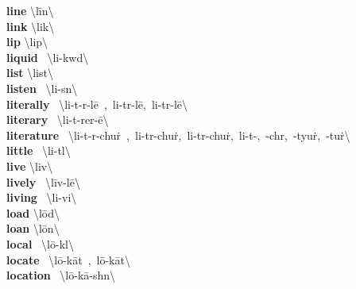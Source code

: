 \documentclass[10pt,a4paper]{article}
\begin{document}
\begin{multicols}{2}
\textbf{ line }\quad \textbackslash \textprimstress l\={i}n\textbackslash \\
\textbf{ link }\quad \textbackslash \textprimstress li\engma k\textbackslash \\
\textbf{ lip }\quad \textbackslash \textprimstress lip\textbackslash \\
\textbf{ liquid }\quad \ \textbackslash \textprimstress li-kw\textschwa d\textbackslash \\
\textbf{ list }\quad \textbackslash \textprimstress list\textbackslash \\
\textbf{ listen }\quad \ \textbackslash \textprimstress li-s\textsuperscript{\textreve}n\textbackslash \\
\textbf{ literally }\quad \ \textbackslash \textprimstress li-t\textschwa -r\textschwa -l\={e}\ ,\ \textprimstress li-tr\textschwa -l\={e},\ \textprimstress li-t\textschwa r-l\={e}\textbackslash \\
\textbf{ literary }\quad \ \textbackslash \textprimstress li-t\textschwa -\textsecstress rer-\={e}\textbackslash \\
\textbf{ literature }\quad \ \textbackslash \textprimstress li-t\textschwa -r\textschwa -\textsecstress chu\. r\ ,\ \textprimstress li-tr\textschwa -\textsecstress chu\. r,\ \textprimstress li-t\textschwa r-\textsecstress chu\. r,\ \textprimstress li-t\textschwa -,\ -ch\textschwa r,\ -\textsecstress tyu\. r,\ -\textsecstress tu\. r\textbackslash \\
\textbf{ little }\quad \ \textbackslash \textprimstress li-t\textsuperscript{\textreve}l\textbackslash \\
\textbf{ live }\quad \textbackslash \textprimstress liv\textbackslash \\
\textbf{ lively }\quad \ \textbackslash \textprimstress l\={i}v-l\={e}\textbackslash \\
\textbf{ living }\quad \ \textbackslash \textprimstress li-vi\engma \textbackslash \\
\textbf{ load }\quad \textbackslash \textprimstress l\={o}d\textbackslash \\
\textbf{ loan }\quad \textbackslash \textprimstress l\={o}n\textbackslash \\
\textbf{ local }\quad \ \textbackslash \textprimstress l\={o}-k\textschwa l\textbackslash \\
\textbf{ locate }\quad \ \textbackslash \textprimstress l\={o}-\textsecstress k\={a}t\ ,\ l\={o}-\textprimstress k\={a}t\textbackslash \\
\textbf{ location }\quad \ \textbackslash l\={o}-\textprimstress k\={a}-sh\textschwa n\textbackslash \\

\end{multicols}
\end{document}

